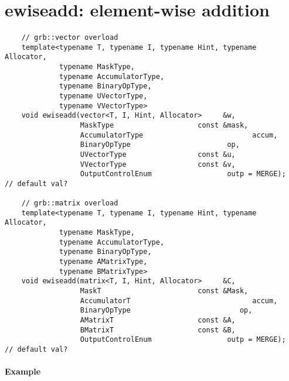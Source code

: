 \section{{\sf ewiseadd}: element-wise addition}

\paragraph{\syntax}

\begin{verbatim}
    // grb::vector overload
    template<typename T, typename I, typename Hint, typename Allocator,
             typename MaskType,
             typename AccumulatorType,
             typename BinaryOpType,
             typename UVectorType,
             typename VVectorType>
    void ewiseadd(vector<T, I, Hint, Allocator>     &w,
                  MaskType                    const &mask,
                  AccumulatorType                          accum,
                  BinaryOpType                       op,
                  UVectorType                 const &u,
                  VVectorType                 const &v,
                  OutputControlEnum                  outp = MERGE);  // default val?

    // grb::matrix overload
    template<typename T, typename I, typename Hint, typename Allocator,
             typename MaskType,
             typename AccumulatorType,
             typename BinaryOpType,
             typename AMatrixType,
             typename BMatrixType>
    void ewiseadd(matrix<T, I, Hint, Allocator>     &C,
                  MaskT                       const &Mask,
                  AccumulatorT                             accum,
                  BinaryOpType                          op,
                  AMatrixT                    const &A,
                  BMatrixT                    const &B,
                  OutputControlEnum                  outp = MERGE);  // default val?
\end{verbatim}


\paragraph{Example}

\begin{verbatim}

\end{verbatim}


